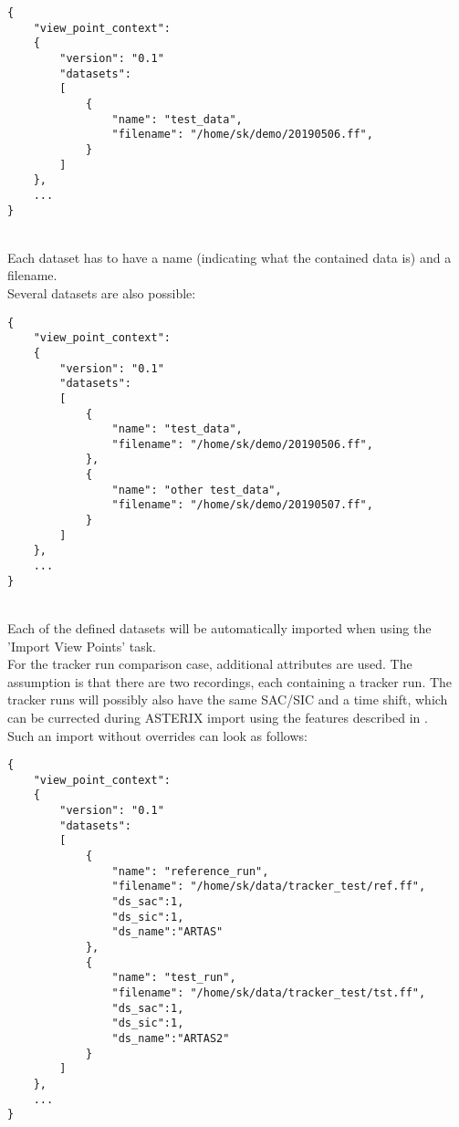 \begin{lstlisting}[basicstyle=\small\ttfamily]
{
    "view_point_context": 
    {
        "version": "0.1"
        "datasets":
        [
            {
                "name": "test_data",
                "filename": "/home/sk/demo/20190506.ff",
            }
        ]
    },
    ...
}
\end{lstlisting}
\ \\

Each dataset has to have a name (indicating what the contained data is) and a filename. \\

Several datasets are also possible:
\begin{lstlisting}[basicstyle=\small\ttfamily]
{
    "view_point_context": 
    {
        "version": "0.1"
        "datasets":
        [
            {
                "name": "test_data",
                "filename": "/home/sk/demo/20190506.ff",
            },
            {
                "name": "other test_data",
                "filename": "/home/sk/demo/20190507.ff",
            }
        ]
    },
    ...
}
\end{lstlisting}
\ \\

Each of the defined datasets will be automatically imported when using the 'Import View Points' task. \\

For the tracker run comparison case, additional attributes are used. The assumption is that there are two recordings, each containing a tracker run. The tracker runs will possibly also have the same SAC/SIC and a time shift, which can be currected during ASTERIX import using the features described in . \\

Such an import without overrides can look as follows:

\begin{lstlisting}[basicstyle=\small\ttfamily]
{
    "view_point_context": 
    {
        "version": "0.1"
        "datasets":
        [
            {
                "name": "reference_run",
                "filename": "/home/sk/data/tracker_test/ref.ff",
                "ds_sac":1,
                "ds_sic":1,
                "ds_name":"ARTAS"
            },
            {
                "name": "test_run",
                "filename": "/home/sk/data/tracker_test/tst.ff",
                "ds_sac":1,
                "ds_sic":1,
                "ds_name":"ARTAS2"
            }
        ]
    },
    ...
}
\end{lstlisting}
\ \\


